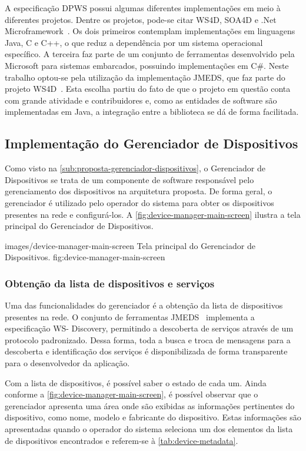 A especificação \gls{DPWS} possui algumas diferentes implementações em meio à diferentes projetos.
Dentre os projetos, pode-se citar WS4D, SOA4D e .Net Microframework~\cite{marcelo2013analise}. Os
dois primeiros contemplam implementações em linguagens Java, C e C++, o que reduz a dependência por
um sistema operacional específico. A terceira faz parte de um conjunto de ferramentas desenvolvido
pela Microsoft para sistemas embarcados, possuindo implementações em C\#. Neste trabalho optou-se
pela utilização da implementação \gls{JMEDS}, que faz parte do projeto
WS4D~\cite{jmeds2013homepage}. Esta escolha partiu do fato de que o projeto em questão conta com
grande atividade e contribuidores e, como as entidades de software são implementadas em Java, a
integração entre a biblioteca se dá de forma facilitada.


\subsection{Implementação do Gerenciador de Dispositivos}

Como visto na \cref{sub:proposta-gerenciador-dispositivos}, o Gerenciador de Dispositivos se trata
de um componente de software responsável pelo gerenciamento dos dispositivos na arquitetura
proposta. De forma geral, o gerenciador é utilizado pelo operador do sistema para obter os
dispositivos presentes na rede e configurá-los. A \cref{fig:device-manager-main-screen} ilustra a
tela principal do Gerenciador de Dispositivos.

  {images/device-manager-main-screen}
  {Tela principal do Gerenciador de Dispositivos.}
  {fig:device-manager-main-screen}


\subsubsection{Obtenção da lista de dispositivos e serviços}

Uma das funcionalidades do gerenciador é a obtenção da lista de dispositivos presentes na rede. O
conjunto de ferramentas \gls{JMEDS}~\cite{jmeds2013homepage} implementa a especificação {WS-
Discovery}, permitindo a descoberta de serviços através de um protocolo padronizado. Dessa forma,
toda a busca e troca de mensagens para a descoberta e identificação dos serviços é disponibilizada
de forma transparente para o desenvolvedor da aplicação.

Com a lista de dispositivos, é possível saber o estado de cada um. Ainda conforme a
\cref{fig:device-manager-main-screen}, é possível observar que o gerenciador apresenta uma área onde
são exibidas as informações pertinentes do dispositivo, como nome, modelo e fabricante do
dispositivo. Estas informações são apresentadas quando o operador do sistema seleciona um dos
elementos da lista de dispositivos encontrados e referem-se à \cref{tab:device-metadata}.

